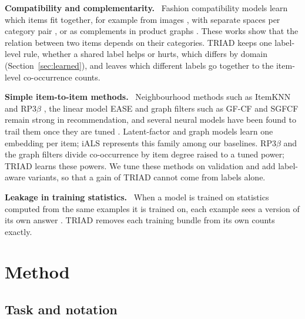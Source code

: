 \documentclass[runningheads]{llncs}
\renewcommand{\paragraph}[1]{\smallskip\noindent\textbf{#1}\ }
\begin{document}
\paragraph{Compatibility and complementarity.} Fashion compatibility models learn which items fit together, for
example from images \cite{han2017}, with separate spaces per category pair \cite{vasileva2018}, or as complements in
product graphs \cite{mcauley}. These works show that the relation between two items depends on their categories.
TRIAD keeps one label-level rule, whether a shared label helps or hurts, which differs by domain
(Section~\ref{sec:learned}), and leaves which different labels go together to the item-level co-occurrence counts.

\paragraph{Simple item-to-item methods.} Neighbourhood methods such as ItemKNN \cite{sarwar2001} and RP3$\beta$
\cite{rp3beta}, the linear model EASE \cite{steck2019} and graph filters such as GF-CF \cite{gfcf} and SGFCF
\cite{sgfcf} remain strong in recommendation, and several neural models have been found to trail them once they are
tuned \cite{dacrema,rendle2020}. Latent-factor and graph models \cite{hu2008,bpr,lightgcn} learn one embedding per
item; iALS \cite{hu2008} represents this family among our baselines. RP3$\beta$ and the graph filters divide co-occurrence by item degree raised to a
tuned power; TRIAD learns these powers. We tune these methods on validation and add label-aware variants, so that a
gain of TRIAD cannot come from labels alone.

\paragraph{Leakage in training statistics.} When a model is trained on statistics computed from the same examples
it is trained on, each example sees a version of its own answer \cite{kapoor2023}. TRIAD removes each training
bundle from its own counts exactly.

\section{Method}
\label{sec:method}

\subsection{Task and notation}
\end{document}
